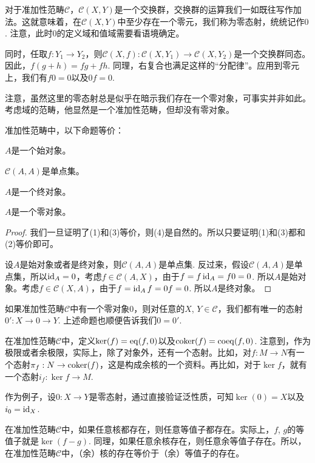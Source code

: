 对于准加性范畴$\mathcal{C}$，$\mathcal{C}(X,Y)$是一个交换群，交换群的运算我们一如既往写作加法。这就意味着，在$\mathcal{C}(X,Y)$中至少存在一个零元，我们称为零态射，统统记作$0$. 注意，此时$0$的定义域和值域需要看语境确定。

同时，任取$f:Y_1\to Y_2$，则$\mathcal{C}(X,f):\mathcal{C}(X,Y_1)\to \mathcal{C}(X,Y_2)$是一个交换群同态。因此，$f(g+h)=fg+fh$. 同理，右复合也满足这样的“分配律”。应用到零元上，我们有$f0=0$以及$0f=0$.

注意，虽然这里的零态射总是似乎在暗示我们存在一个零对象，可事实并非如此。考虑域的范畴，他显然是一个准加性范畴，但却没有零对象。

\begin{pro}\label{zeroobj}
准加性范畴中，以下命题等价：
\begin{compactenum}[~~~(1)]
\item $A$是一个始对象。
\item $\mathcal{C}(A,A)$是单点集。
\item $A$是一个终对象。
\item $A$是一个零对象。
\end{compactenum}
\end{pro}

\begin{proof}
我们一旦证明了(1)和(3)等价，则(4)是自然的。所以只要证明(1)和(3)都和(2)等价即可。

设$A$是始对象或者是终对象，则$\mathcal{C}(A,A)$是单点集. 反过来，假设$\mathcal{C}(A,A)$是单点集，所以$\operatorname{id}_A=0$，考虑$f\in \mathcal{C}(A,X)$，由于$f=f\operatorname{id}_A=f0=0$. 所以$A$是始对象。考虑$f\in \mathcal{C}(X,A)$，由于$f=\operatorname{id}_A f=0f=0$. 所以$A$是终对象。
\end{proof}

如果准加性范畴$\mathcal{C}$中有一个零对象$0$，则对任意的$X$, $Y\in\mathcal{C}$，我们都有唯一的态射$0': X\to 0 \to Y$. 上述命题也顺便告诉我们$0=0'$. 

\begin{para}
在准加性范畴$\mathcal{C}$中，定义$\ker(f)=\operatorname{eq}(f,0)$以及$\operatorname{coker}(f)=\mathrm{coeq}(f,0)$. 注意到，作为极限或者余极限，实际上，除了对象外，还有一个态射。比如，对$f:M\to N$有一个态射$\pi_f:N\to \operatorname{coker}(f)$，这是构成余核的一个资料。再比如，对于$\ker f$，就有一个态射$i_f:\ker f\to M$. 

作为例子，设$0:X\to Y$是零态射，通过直接验证泛性质，可知$\ker(0)=X$以及$i_0=\operatorname{id}_X$.
\end{para}

\begin{para}
在准加性范畴$\mathcal{C}$中，如果任意核都存在，则任意等值子都存在。实际上，$f$, $g$的等值子就是$\ker(f-g)$. 同理，如果任意余核存在，则任意余等值子存在。所以，在准加性范畴$\mathcal{C}$中，（余）核的存在等价于（余）等值子的存在。
\end{para}

